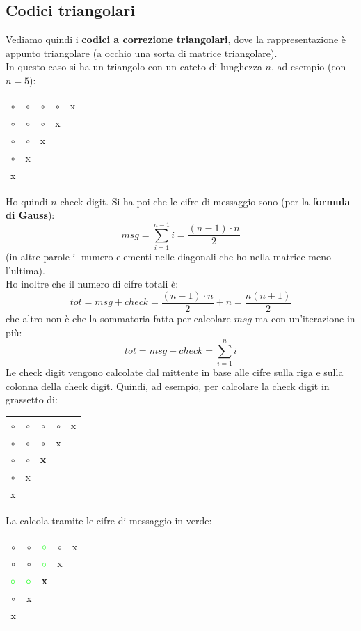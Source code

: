 \documentclass[a4paper,12pt, oneside]{book}
\begin{document}
\subsection{Codici triangolari}
Vediamo quindi i \textbf{codici a correzione triangolari}, dove la
rappresentazione è appunto triangolare (a occhio una sorta di matrice
triangolare).\\ 
In questo caso si ha un triangolo con un cateto di lunghezza $n$, ad esempio
(con $n=5$): 
\begin{table}[H]
  \centering
  \begin{tabular}{ccccc}
    $\circ$ & $\circ$ & $\circ$ &$\circ$  & x\\
    $\circ$ & $\circ$ & $\circ$  & x&\\
    $\circ$ & $\circ$ & x&&\\
    $\circ$ &x&&&\\
    x&&&&
  \end{tabular}
\end{table}
Ho quindi $n$ check digit. Si ha poi che le
cifre di messaggio sono (per la \textbf{formula di Gauss}):
\[msg=\sum_{i=1}^{n-1}i=\frac{(n-1)\cdot n}{2}\]
(in altre parole il numero elementi nelle diagonali che ho nella matrice meno
l'ultima).\\ 
Ho inoltre che il numero di cifre totali è:
\[tot=msg+check=\frac{(n-1)\cdot n}{2}+n=\frac{n(n+1)}{2}\]
che altro non è che la sommatoria fatta per calcolare $msg$ ma con un'iterazione
in più:
\[tot=msg+check=\sum_{i=1}^{n}i\]
Le check digit vengono calcolate dal mittente in base alle cifre sulla riga e
sulla colonna della check digit. Quindi, ad esempio, per calcolare la check
digit in grassetto di:
\begin{table}[H]
  \centering
  \begin{tabular}{ccccc}
    $\circ$ & $\circ$ & $\circ$ &$\circ$  & x\\
    $\circ$ & $\circ$ & $\circ$  & x&\\
    $\circ$ & $\circ$ & \textbf{x}&&\\
    $\circ$ &x&&&\\
    x&&&&
  \end{tabular}
\end{table}
La calcola tramite le cifre di messaggio in verde:
\begin{table}[H]
  \centering
  \begin{tabular}{ccccc}
    $\circ$ & $\circ$ & ${\color{green}\circ}$ &$\circ$  & x\\
    $\circ$ & $\circ$ & ${\color{green}\circ}$  & x&\\
    ${\color{green}\circ}$ & ${\color{green}\circ}$ & \textbf{x}&&\\
    $\circ$ &x&&&\\
    x&&&&
  \end{tabular}
\end{table}
\end{document}
